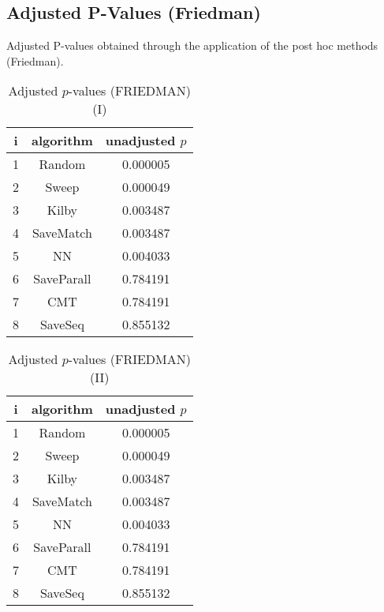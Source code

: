 \documentclass[a4paper,10pt]{article}
\begin{document}
\begin{landscape}
\section{Adjusted P-Values (Friedman)}


Adjusted P-values obtained through the application of the post hoc methods (Friedman).

\begin{table}[!htp]
\centering\small
\begin{tabular}{ccc}
i&algorithm&unadjusted $p$\\
\hline1&Random&0.000005\\2&Sweep&0.000049\\3&Kilby&0.003487\\4&SaveMatch&0.003487\\5&NN&0.004033\\6&SaveParall&0.784191\\7&CMT&0.784191\\8&SaveSeq&0.855132\\\hline
\end{tabular}
\caption{Adjusted $p$-values (FRIEDMAN) (I)}
\end{table}
\begin{table}[!htp]
\centering\small
\begin{tabular}{ccc}
i&algorithm&unadjusted $p$\\
\hline1&Random&0.000005\\2&Sweep&0.000049\\3&Kilby&0.003487\\4&SaveMatch&0.003487\\5&NN&0.004033\\6&SaveParall&0.784191\\7&CMT&0.784191\\8&SaveSeq&0.855132\\\hline
\end{tabular}
\caption{Adjusted $p$-values (FRIEDMAN) (II)}
\end{table}

\newpage
\end{landscape}
\end{document}
